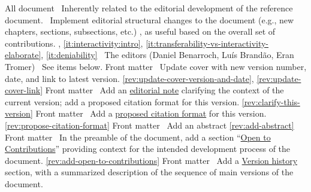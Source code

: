 All document
\newcol \ccontext\ Inherently related to the editorial development of the reference document. 
				\propContrib\ Implement editorial structural changes to the document (e.g., new chapters, 
				sections, subsections, etc.) , as useful based on the overall set of contributions.
\newcol {}, \ref{it:interactivity:intro}, \ref{it:transferability-vs-interactivity-elaborate}, \ref{it:deniability}
\newcol \contributors\ The editors (Daniel Benarroch, Luís Brandão, Eran Tromer)
				\Chan\ See items below.
\newcol 
\rowendL
Front matter
\newcol 
\newcol {}
\newcol \Chan\ Update cover with new version number, date, and link to latest version.
\newcol \ref{rev:update-cover-version-and-date}, \ref{rev:update-cover-link}
\rowendL
Front matter
\newcol 
\newcol {}
\newcol \Chan\ Add an \hyperref[sec:prelim:msg-editors]{editorial note} clarifying the context of the current version; add a proposed citation format for this version.
\newcol \ref{rev:clarify-this-version}
\rowendL
Front matter
\newcol 
\newcol {}
\newcol \Chan\ Add a \hyperref[how-to-cite-this-version]{proposed citation format} for this version.
\newcol \ref{rev:propose-citation-format}
\rowendL
Front matter
\newcol 
\newcol {}
\newcol \Chan\ Add an abstract
\newcol \ref{rev:add-abstract}
\rowendL
Front matter
\newcol 
\newcol {}
\newcol \Chan\ In the preamble of the document, add a section ``\hyperref[sec:prelim:open-to-contributions]{Open to Contributions}'' providing context for the intended development process of the document.
\newcol \ref{rev:add-open-to-contributions}
\rowendL
Front matter
\newcol 
\newcol {}
\newcol \Chan\ Add a \hyperref[sec:prelim:change-log]{Version history} section, with a summarized description of the sequence of main versions of the document.
